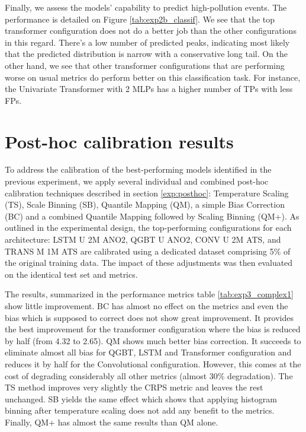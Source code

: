 \documentclass[12pt,a4paper]{book}
\begin{document}
Finally, we assess the models' capability to predict high-pollution events. The performance is detailed on Figure \ref{tab:exp2b_classif}. We see that the top transformer configuration does not do a better job than the other configurations in this regard. There's a low number of predicted peaks, indicating most likely that the predicted distribution is narrow with a conservative long tail. On the other hand, we see that other transformer configurations that are performing worse on usual metrics do perform better on this classification task. For instance, the Univariate Transformer with 2 MLPs has a higher number of TPs with less FPs.

\section{Post-hoc calibration results}

To address the calibration of the best-performing models identified in the previous experiment, we apply several individual and combined post-hoc calibration techniques described in section \ref{exp:posthoc}: Temperature Scaling (TS), Scale Binning (SB), Quantile Mapping (QM), a simple Bias Correction (BC) and a combined Quantile Mapping followed by Scaling Binning (QM+). As outlined in the experimental design, the top-performing configurations for each architecture: LSTM U 2M ANO2, QGBT U ANO2, CONV U 2M ATS, and TRANS M 1M ATS are calibrated using a dedicated dataset comprising 5\% of the original training data. The impact of these adjustments was then evaluated on the identical test set and metrics.

The results, summarized in the performance metrics table \ref{tab:exp3_complex1} show little improvement. BC has almost no effect on the metrics and even the bias which is supposed to correct does not show great improvement. It provides the best improvement for the transformer configuration where the bias is reduced by half (from 4.32 to 2.65). QM shows much better bias correction. It succeeds to eliminate almost all bias for QGBT, LSTM and Transformer configuration and reduces it by half for the Convolutional configuration. However, this comes at the cost of degrading considerably all other metrics (almost 30\% degradation). The TS method improves very slightly the CRPS metric and leaves the rest unchanged. SB yields the same effect which shows that applying histogram binning after temperature scaling does not add any benefit to the metrics. Finally, QM+ has almost the same results than QM alone.
\end{document}
